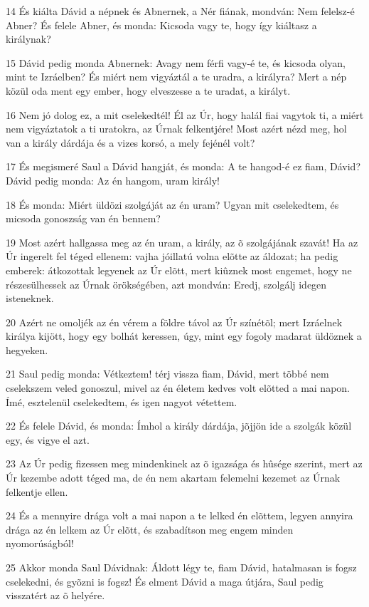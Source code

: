 \par 14 És kiálta Dávid a népnek és Abnernek, a Nér fiának, mondván: Nem felelsz-é Abner? És felele Abner, és monda: Kicsoda vagy te, hogy így kiáltasz a királynak?
\par 15 Dávid pedig monda Abnernek: Avagy nem férfi vagy-é te, és kicsoda olyan, mint te Izráelben? És miért nem vigyáztál a te uradra, a királyra? Mert a nép közül oda ment egy ember, hogy elveszesse a te uradat, a királyt.
\par 16 Nem jó dolog ez, a mit cselekedtél! Él az Úr, hogy halál fiai vagytok ti, a miért nem vigyáztatok a ti uratokra, az Úrnak felkentjére! Most azért nézd meg, hol van a király dárdája és a vizes korsó, a mely fejénél volt?
\par 17 És megismeré Saul a Dávid hangját, és monda: A te hangod-é ez fiam, Dávid? Dávid pedig monda: Az én hangom, uram király!
\par 18 És monda: Miért üldözi szolgáját az én uram? Ugyan mit cselekedtem, és micsoda gonoszság van én bennem?
\par 19 Most azért hallgassa meg az én uram, a király, az õ szolgájának szavát! Ha az Úr ingerelt fel téged ellenem: vajha jóillatú volna elõtte az áldozat; ha pedig emberek: átkozottak legyenek az Úr elõtt, mert kiûznek most engemet, hogy ne részesülhessek az Úrnak örökségében, azt mondván: Eredj, szolgálj idegen isteneknek.
\par 20 Azért ne omoljék az én vérem a földre távol az Úr színétõl; mert Izráelnek királya kijött, hogy egy bolhát keressen, úgy, mint egy fogoly madarat üldöznek a hegyeken.
\par 21 Saul pedig monda: Vétkeztem! térj vissza fiam, Dávid, mert többé nem cselekszem veled gonoszul, mivel az én életem kedves volt elõtted a mai napon. Ímé, esztelenül cselekedtem, és igen nagyot vétettem.
\par 22 És felele Dávid, és monda: Ímhol a király dárdája, jõjjön ide a szolgák közül egy, és vigye el azt.
\par 23 Az Úr pedig fizessen meg mindenkinek az õ igazsága és hûsége szerint, mert az Úr kezembe adott téged ma, de én nem akartam felemelni kezemet az Úrnak felkentje ellen.
\par 24 És a mennyire drága volt a mai napon a te lelked én elõttem, legyen annyira drága az én lelkem az Úr elõtt, és szabadítson meg engem minden nyomorúságból!
\par 25 Akkor monda Saul Dávidnak: Áldott légy te, fiam Dávid, hatalmasan is fogsz cselekedni, és gyõzni is fogsz! És elment Dávid a maga útjára, Saul pedig visszatért az õ helyére.

